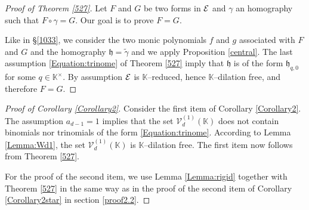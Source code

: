 \documentclass[10pt]{article}
\theoremstyle{definition}
\numberwithin{equation}{section}
\newcommand {\K}{{\mathbb{K}}}
\begin{document}
 \begin{proof}[Proof of Theorem \ref{527}]
 Let $F$ and $G$ be two forms in $\cal E$ and $\gamma$ an homography such that $F\circ\gamma=G$. Our goal is to prove $F=G$. 
 
 Like in \S \ref{1033}, we consider the two monic polynomials $f$ and $g$ associated with $F$ and $G$ and the homography $ \mathfrak h= \tilde \gamma$ and we apply Proposition \ref{central}. The last assumption \eqref{Equation:trinome} of Theorem \ref{527} imply that $ \mathfrak h$ is of the form $\mathfrak h_{q,0}$ for some $q\in\K^\times$. By assumption $\cal E$ is $\K$--reduced, hence $\K$--dilation free, and therefore $F=G$.
 \end{proof}

\begin{proof}[Proof of Corollary \ref{Corollary2}]
Consider the first item of Corollary \ref{Corollary2}. The assumption $a_{d-1}=1$ implies that the set $\mathcal V^{(1)}_{d} (\K)$ does not contain binomials nor trinomials of the form \eqref{Equation:trinome}. 
According to Lemma \ref{Lemma:Wd1}, the set $\mathcal V^{(1)}_{d} (\K)$ is $\K$--dilation free. 
The first item now follows from Theorem \ref{527}.
 

For the proof of the second item, we use Lemma \ref{Lemma:rigid} together with Theorem \ref{527} in the same way as in the proof of the second item of Corollary \ref{Corollary2star} in section \ref{proof2.2}.
\end{proof}

 
\end{document}
